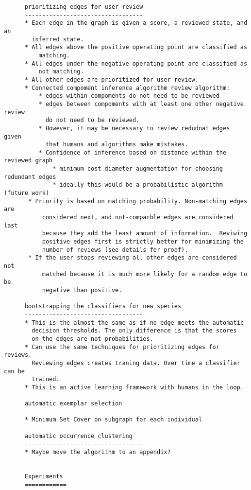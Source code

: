 \begin{verbatim}
      prioritizing edges for user-review
      ----------------------------------
      * Each edge in the graph is given a score, a reviewed state, and an
        inferred state.
      * All edges above the positive operating point are classified as
          matching.
      * All edges under the negative operating point are classified as
          not matching.
      * All other edges are prioritized for user review. 
      * Connected compoment inference algorithm review algorithm:
          * edges within compoments do not need to be reviewed 
          * edges between compoments with at least one other negative review
            do not need to be reviewed.
          * However, it may be necessary to review redudnat edges given
            that humans and algorithms make mistakes.
          * Confidence of inference based on distance within the reviewed graph
              * minimum cost diameter augmentation for choosing redundant edges
              * ideally this would be a probabilistic algorithm (future work)
       * Priority is based on matching probability. Non-matching edges are
           considered next, and not-comparble edges are considered last
           because they add the least amount of information.  Reviwing
           positive edges first is strictly better for minimizing the
           number of reviews (see details for proof).
       * If the user stops reviewing all other edges are considered not
           matched because it is much more likely for a random edge to be
           negative than positive.

      bootstrapping the classifiers for new species
      ----------------------------------
      * This is the almost the same as if no edge meets the automatic
        decision thresholds. The only difference is that the scores
        on the edges are not probabilities.
      * Can use the same techniques for prioritizing edges for reviews.
        Reviewing edges creates traning data. Over time a classifier can be
        trained.
      * This is an active learning framework with humans in the loop.

      automatic exemplar selection
      ----------------------------------
      * Minimum Set Cover on subgraph for each individual

      automatic occurrence clustering
      ----------------------------------
      * Maybe move the algorithm to an appendix?


      Experiments 
      ============


\end{verbatim}
